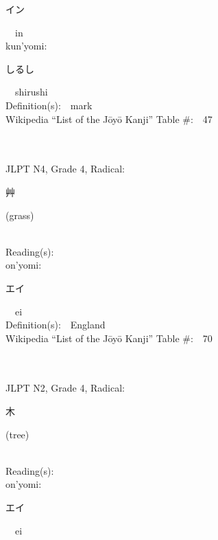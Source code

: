 \begin{multicols}{2}
{\hspace*{2em}}{\begin{CJK}{UTF8}{min} イン \end{CJK}}\ \ in\ \ \\
{\hspace*{1em}}kun'yomi:\ \ \\
{\hspace*{2em}}{\begin{CJK}{UTF8}{min} しるし \end{CJK}}\ \ shirushi\ \ \\
Definition(s):\ \ mark \\
Wikipedia ``List of the J\=oy\=o Kanji'' Table \#:\ \ 47 \\
\ \ \\
{\fontsize{34pt}{40pt}  }\ \ \\  %
{JLPT N4, Grade 4, Radical:\ \ {\begin{CJK}{UTF8}{min} 艸 \end{CJK}} (grass) } \\
Reading(s):\ \ \\
{\hspace*{1em}}on'yomi:\ \ \\
{\hspace*{2em}}{\begin{CJK}{UTF8}{min} エイ \end{CJK}}\ \ ei\ \ \\
Definition(s):\ \ England \\
Wikipedia ``List of the J\=oy\=o Kanji'' Table \#:\ \ 70 \\
\ \ \\
{\fontsize{34pt}{40pt}  }\ \ \\  %
{JLPT N2, Grade 4, Radical:\ \ {\begin{CJK}{UTF8}{min} 木 \end{CJK}} (tree) } \\
Reading(s):\ \ \\
{\hspace*{1em}}on'yomi:\ \ \\
{\hspace*{2em}}{\begin{CJK}{UTF8}{min} エイ \end{CJK}}\ \ ei\ \ \\

\end{multicols}
